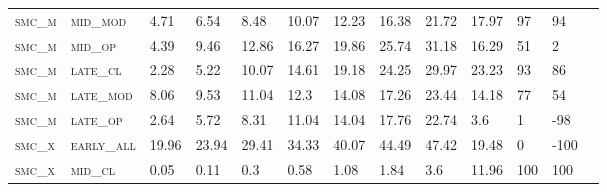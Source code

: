 \begin{landscape}
\begin{table}[!htbp]
\begin{tabular}{@{}lllllllllllll@{}}
\footnotesize \textsc{smc\_m}      & \footnotesize \textsc{mid\_mod  }               & \footnotesize 4.71           & \footnotesize  6.54           & \footnotesize 8.48             & \footnotesize 10.07            & \footnotesize 12.23            & \footnotesize 16.38            & \footnotesize 21.72       & \footnotesize 17.97    & \footnotesize 97      & \footnotesize 94    \\
\footnotesize \textsc{smc\_m}      & \footnotesize \textsc{mid\_op   }               & \footnotesize 4.39           & \footnotesize  9.46           & \footnotesize 12.86            & \footnotesize 16.27            & \footnotesize 19.86            & \footnotesize 25.74            & \footnotesize 31.18       & \footnotesize 16.29    & \footnotesize 51      & \footnotesize 2    \\
\footnotesize \textsc{smc\_m}      & \footnotesize \textsc{late\_cl  }               & \footnotesize 2.28           & \footnotesize  5.22           & \footnotesize 10.07            & \footnotesize 14.61            & \footnotesize 19.18            & \footnotesize 24.25            & \footnotesize 29.97       & \footnotesize 23.23    & \footnotesize 93      & \footnotesize 86    \\
\footnotesize \textsc{smc\_m}      & \footnotesize \textsc{late\_mod }               & \footnotesize 8.06           & \footnotesize  9.53           & \footnotesize 11.04            & \footnotesize 12.3             & \footnotesize 14.08            & \footnotesize 17.26            & \footnotesize 23.44       & \footnotesize 14.18    & \footnotesize 77      & \footnotesize 54    \\
\footnotesize \textsc{smc\_m}      & \footnotesize \textsc{late\_op  }               & \footnotesize 2.64           & \footnotesize  5.72           & \footnotesize 8.31             & \footnotesize 11.04            & \footnotesize 14.04            & \footnotesize 17.76            & \footnotesize 22.74       & \footnotesize 3.6      & \footnotesize 1       & \footnotesize -98    \\  \hline
\footnotesize \textsc{smc\_x}      & \footnotesize \textsc{early\_all}     & \footnotesize 19.96           & \footnotesize 23.94           & \footnotesize 29.41            & \footnotesize 34.33            & \footnotesize 40.07            & \footnotesize 44.49           & \footnotesize 47.42        & \footnotesize 19.48    & \footnotesize 0    & \footnotesize -100     \\
\footnotesize \textsc{smc\_x}      & \footnotesize \textsc{mid\_cl   }     & \footnotesize 0.05           & \footnotesize 0.11           & \footnotesize 0.3            & \footnotesize 0.58            & \footnotesize 1.08            & \footnotesize 1.84           & \footnotesize 3.6        & \footnotesize 11.96    & \footnotesize 100    & \footnotesize 100     \\

\end{tabular}
\end{table}
\end{landscape}
